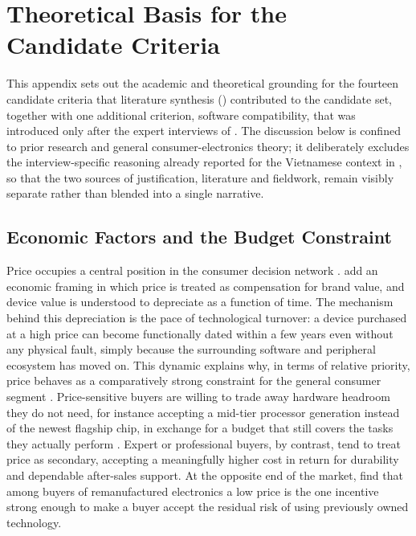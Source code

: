 \chapter{Theoretical Basis for the Candidate Criteria}\label{app:criteria-theory}

This appendix sets out the academic and theoretical grounding for the fourteen candidate
criteria that literature synthesis () contributed to the
candidate set, together with one additional criterion, software compatibility, that was
introduced only after the expert interviews of . The
discussion below is confined to prior research and general consumer-electronics theory; it
deliberately excludes the interview-specific reasoning already reported for the
Vietnamese context in , so that the two sources of
justification, literature and fieldwork, remain visibly separate rather than blended into
a single narrative.

\section{Economic Factors and the Budget Constraint}\label{app:theory-economic}

Price occupies a central position in the consumer decision network
\parencite{sonmez_cakir_determination_2020}. \textcite{rau_optimal_2018} add an economic
framing in which price is treated as compensation for brand value, and device value is
understood to depreciate as a function of time. The mechanism behind this depreciation is
the pace of technological turnover: a device purchased at a high price can become
functionally dated within a few years even without any physical fault, simply because the
surrounding software and peripheral ecosystem has moved on. This dynamic explains why, in
terms of relative priority, price behaves as a comparatively strong constraint for the
general consumer segment \parencite{weng_siew_lam_evaluation_2023}. Price-sensitive buyers
are willing to trade away hardware headroom they do not need, for instance accepting a
mid-tier processor generation instead of the newest flagship chip, in exchange for a budget
that still covers the tasks they actually perform \parencite{maghsoudi_hybrid_2026}. Expert
or professional buyers, by contrast, tend to treat price as secondary, accepting a
meaningfully higher cost in return for durability and dependable after-sales support. At
the opposite end of the market, \textcite{jimenez-parra_key_2014} find that among buyers of
remanufactured electronics a low price is the one incentive strong enough to make a buyer
accept the residual risk of using previously owned technology.

